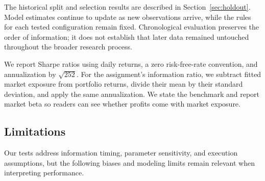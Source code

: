 \documentclass[11pt,letterpaper]{article}
\begin{document}
The historical split and selection results are described in Section~\ref{sec:holdout}. Model
estimates continue to update as new observations arrive, while the rules for each tested
configuration remain fixed. Chronological evaluation preserves the order of information; it
does not establish that later data remained untouched throughout the broader research
process.

We report Sharpe ratios using daily returns, a zero risk-free-rate
convention, and annualization by \(\sqrt{252}\). For the assignment's
information ratio, we subtract fitted market exposure from portfolio
returns, divide their mean by their standard deviation, and apply the
same annualization. We state the benchmark and report market beta so
readers can see whether profits come with market exposure.

\subsection{Limitations}

Our tests address information timing, parameter sensitivity, and execution
assumptions, but the following biases and modeling limits remain relevant
when interpreting performance.
\end{document}
